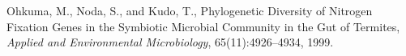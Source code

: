 \documentclass[portrait,a0]{a0poster}
\begin{document}
\begin{multicols}{3}
\begin{thebibliography}{10}
Ohkuma, M., Noda, S., and Kudo, T.,
Phylogenetic Diversity of Nitrogen Fixation Genes in the Symbiotic Microbial Community in the Gut of Termites,
{\em Applied and Environmental Microbiology}, 65(11):4926--4934, 1999.
\end{thebibliography}
\vspace{10mm}
\begin{flushright}
\color[cmyk]{0,0,0,1}\fontsize{28}{20}\selectfont {}
\end{flushright}
\end{multicols}

\begin{center}
\end{center}

\begin{center}
\end{center}

\begin{center}
\end{center}
\end{document}
